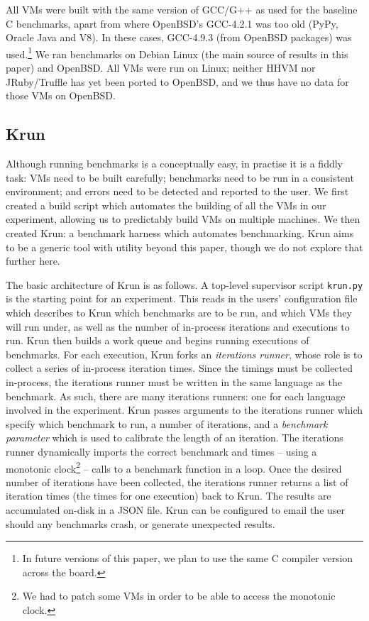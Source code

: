 \documentclass[10pt,preprint]{sigplanconf}
\newcommand{\krun}{Krun\xspace}
\begin{document}
All VMs were built with the same version of GCC/G++ as used for the baseline C
benchmarks, apart from where OpenBSD's GCC-4.2.1 was too old (PyPy, Oracle Java
and V8). In these cases, GCC-4.9.3 (from OpenBSD packages) was used.\footnote{In
future versions of this paper, we plan to use the same C compiler version
across the board.} We ran benchmarks on Debian Linux (the main source of
results in this paper) and
OpenBSD. All VMs were run on Linux; neither HHVM nor JRuby/Truffle has yet been
ported to OpenBSD, and we thus have no data for those VMs on OpenBSD.


\subsection{\krun}

Although running benchmarks is a conceptually easy, in practise it is a fiddly task:
VMs need to be built carefully; benchmarks need to be run in a consistent
environment; and errors need to be detected and reported to the user. We first created
a build script which automates the building of all the VMs in our experiment, allowing
us to predictably build VMs on multiple machines. We then created \krun: a
benchmark harness which automates benchmarking. \krun aims to be a generic tool
with utility beyond this paper, though we do not explore that further here.

The basic architecture of \krun is as follows. A top-level supervisor script
\texttt{krun.py} is the starting point for an experiment. This reads in the
users' configuration file which describes to \krun which benchmarks are to be run, and
which VMs they will run under, as well as the number of in-process iterations
and executions to run. \krun then builds a work queue and begins running
executions of benchmarks. For each execution, \krun forks an \emph{iterations
runner}, whose role is to collect a series of in-process iteration times. Since
the timings must be collected in-process, the iterations runner must be written
in the same language as the benchmark. As such, there are many iterations
runners: one for each language involved in the experiment. \krun passes
arguments to the iterations runner which specify which benchmark to run, a
number of iterations, and a \emph{benchmark parameter} which is used to
calibrate the length of an iteration. The iterations runner dynamically imports
the correct benchmark and times -- using a monotonic clock\footnote{We had to
patch some VMs in order to be able to access the monotonic clock.} -- calls to
a benchmark function in a loop. Once
the desired number of iterations have been collected, the iterations runner
returns a list of iteration times (the times for one execution) back to \krun.
The results are accumulated on-disk in a JSON file. \krun can be configured to
email the user should any benchmarks crash, or generate unexpected results.
\end{document}
